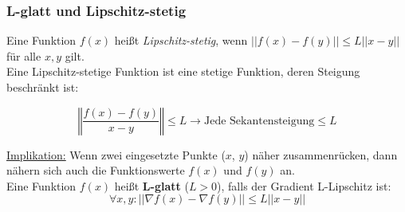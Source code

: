 \subsubsection{L-glatt und Lipschitz-stetig}

Eine Funktion \(f(x)\) heißt \emph{Lipschitz-stetig}, wenn \(||f(x) - f(y)|| \leq L ||x - y||\) für alle \(x, y\) gilt.\\

Eine Lipschitz-stetige Funktion ist eine stetige Funktion, deren Steigung beschränkt ist:

\begin{equation*}
    \left\Vert\frac{f(x)-f(y)}{x-y}\right\Vert \leq L \rightarrow \text{Jede Sekantensteigung} \leq L
\end{equation*}

\underline{Implikation:} Wenn zwei eingesetzte Punkte (\(x\), \(y\)) näher zusammenrücken, dann nähern sich auch die Funktionswerte \(f(x)\) und \(f(y)\) an.\\


Eine Funktion \(f(x)\) heißt \textbf{L-glatt} (\(L>0\)), falls der Gradient L-Lipschitz ist:
\begin{equation*}
    \forall x, y: ||\nabla f(x) - \nabla f(y)|| \leq L ||x - y||
\end{equation*}
